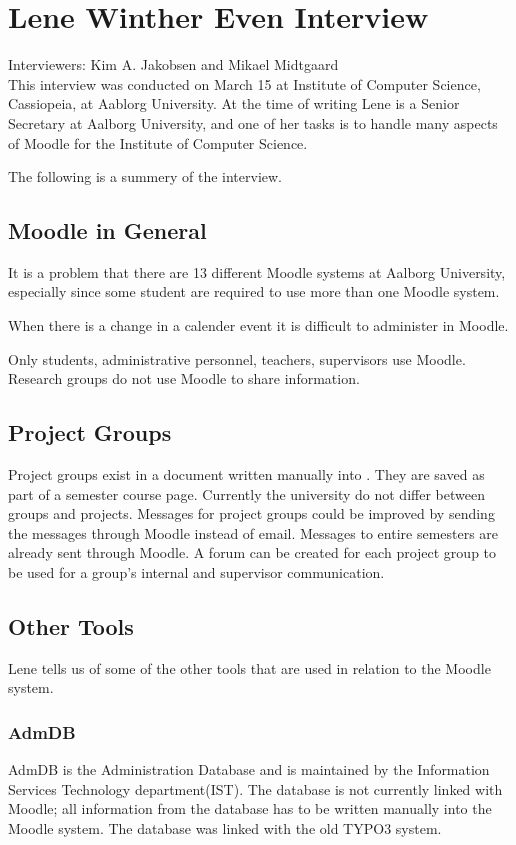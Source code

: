 \section{Lene Winther Even Interview}
\label{sec:lene}
Interviewers: Kim A. Jakobsen and Mikael Midtgaard\\


This interview was conducted on March 15\ths{} at Institute of Computer Science, Cassiopeia, at Aablorg University.
At the time of writing Lene is a Senior Secretary at Aalborg University, and one of her tasks is to handle many aspects of Moodle for the Institute of Computer Science.

The following is a summery of the interview.

\subsection*{Moodle in General}
It is a problem that there are 13 different Moodle systems at Aalborg University, especially since some student are required to use more than one Moodle system.

When there is a change in a calender event it is difficult to administer in Moodle.

Only students, administrative personnel, teachers, supervisors use Moodle.
Research groups do not use Moodle to share information.

\subsection*{Project Groups}
Project groups exist in a document written manually into \moodle{}.
They are saved as part of a semester course page.
Currently the university do not differ between groups and projects.
Messages for project groups could be improved by sending the messages through Moodle instead of email.
Messages to entire semesters are already sent through Moodle.
A forum can be created for each project group to be used for a group's internal and supervisor communication.

\subsection*{Other Tools}
Lene tells us of some of the other tools that are used in relation to the Moodle system.

\subsubsection*{AdmDB}
AdmDB is the Administration Database and is maintained by the Information Services Technology department(IST).
The database is not currently linked with Moodle; all information from the database has to be written manually into the Moodle system.
The database was linked with the old TYPO3 system.

